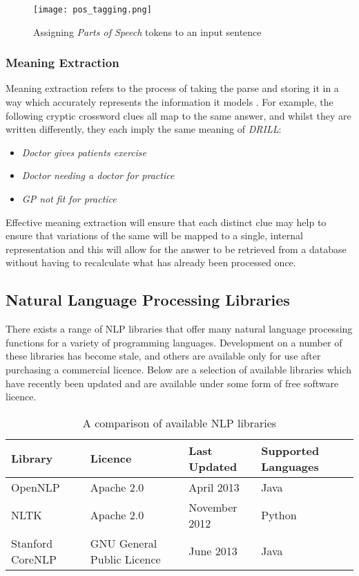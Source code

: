 \begin{figure}[H]
	\centering
	\texttt{[image: pos\_tagging.png]}
	\caption{Assigning \emph{Parts of Speech} tokens to an input sentence}
\end{figure}

\subsubsection{Meaning Extraction}

Meaning extraction refers to the process of taking the parse and storing it in a
way which accurately represents the information it models \citep{mccluskey99}.
For example, the following cryptic crossword clues all map to the same answer,
and whilst they are written differently, they each imply the same meaning of
\emph{DRILL}:

\begin{itemize}
	\item \emph{Doctor gives patients exercise}
	\item \emph{Doctor needing a doctor for practice}
	\item \emph{GP not fit for practice}
\end{itemize}

\begin{flushright}
	\citep{gordius03}
\end{flushright}

Effective meaning extraction will ensure that each distinct clue may help to
ensure that variations of the same will be mapped to a single, internal
representation and this will allow for the answer to be retrieved from a
database without having to recalculate what has already been processed once.

\subsection{Natural Language Processing Libraries}

There exists a range of NLP libraries that offer many natural language
processing functions for a variety of programming languages. Development on a
number of these libraries has become stale, and others are available only for
use after purchasing a commercial licence. Below are a selection of available
libraries which have recently been updated and are available under some form of
free software licence.

\begin{table}[H]
	\centering
	\small
	\begin{tabular}{|p{3.3cm}|p{4.9cm}|p{3.0cm}|p{2.3cm}|}
	\hline
	\textbf{Library} & \textbf{Licence} & \textbf{Last Updated}  &
	\textbf{Supported Languages} \\ \hline
	OpenNLP & Apache 2.0 &  April 2013 & Java \\ \hline
	NLTK & Apache 2.0 & November 2012 & Python \\ \hline
	Stanford CoreNLP & GNU General Public Licence & June 2013 & Java \\	\hline
	\end{tabular}
	\caption {A comparison of available NLP libraries}
\end{table}

